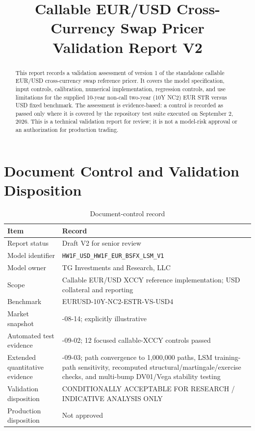 \documentclass[conference]{IEEEtran}
\title{Callable EUR/USD Cross-Currency Swap Pricer\\Validation Report V2}
\author{\TGIRArticleAuthorBlock}
\begin{document}
\maketitle

\begin{abstract}
This report records a validation assessment of version 1 of the standalone callable EUR/USD cross-currency swap reference pricer. It covers the model specification, input controls, calibration, numerical implementation, regression controls, and use limitations for the supplied 10-year non-call two-year (10Y NC2) EUR \texteuro STR versus USD fixed benchmark. The assessment is evidence-based: a control is recorded as passed only where it is covered by the repository test suite executed on September 2, 2026. This is a technical validation report for review; it is not a model-risk approval or an authorization for production trading.
\end{abstract}

\section{Document Control and Validation Disposition}

\begin{table}[H]
\centering
\begin{tabularx}{\columnwidth}{>{\raggedright\arraybackslash}p{}>{\raggedright\arraybackslash}X}
\toprule
\textbf{Item} & \textbf{Record} \\
\midrule
Report status & Draft V2 for senior review \\
Model identifier & \texttt{HW1F\_USD\_HW1F\_EUR\_BSFX\_LSM\_V1} \\
Model owner & TG Investments and Research, LLC \\
Scope & Callable EUR/USD XCCY reference implementation; USD collateral and reporting \\
Benchmark & EURUSD-10Y-NC2-ESTR-VS-USD4 \\
Market snapshot & 2026-08-14; explicitly illustrative \\
Automated test evidence & 2026-09-02; 12 focused callable-XCCY controls passed \\
Extended quantitative evidence & 2026-09-03; path convergence to 1,000,000 paths, LSM training-path sensitivity, recomputed structural/martingale/exercise checks, and multi-bump DV01/Vega stability testing \\
Validation disposition & \textcolor{conditional}{CONDITIONALLY ACCEPTABLE FOR RESEARCH / INDICATIVE ANALYSIS ONLY} \\
Production disposition & Not approved \\
\bottomrule
\end{tabularx}
\caption{Document-control record}
\end{table}
\end{document}
